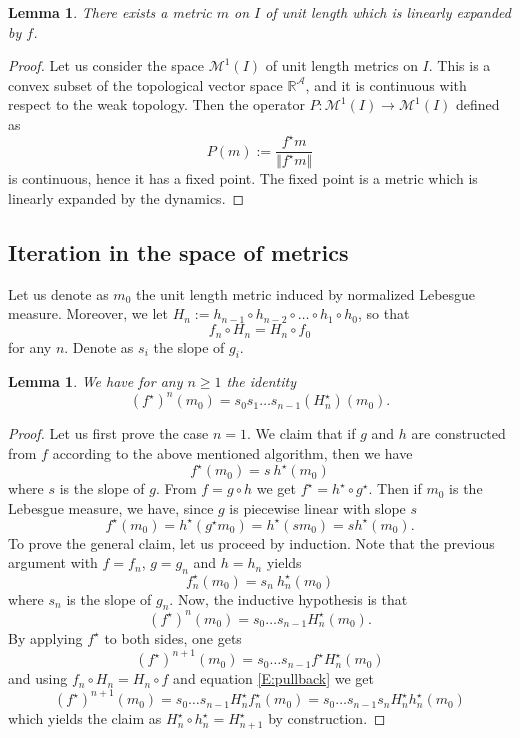 \documentclass[11pt]{amsart}
\newtheorem{lemma}[theorem]{Lemma}
\begin{document}
\begin{lemma}
There exists a metric $m$ on $I$ of unit length which is linearly expanded by $f$. 
\end{lemma}

\begin{proof}
Let us consider the space $\mathcal{M}^1(I)$ of unit length metrics on $I$. This is a convex subset of the topological vector space $\mathbb{R}^{\mathcal{A}}$, and it is continuous with respect to the weak topology. 
Then the operator 
$P :  \mathcal{M}^1(I) \to \mathcal{M}^1(I)$ defined as 
$$P(m) := \frac{f^\star m}{\Vert f^\star m \Vert}$$
is continuous, hence it has a fixed point. The fixed point is a metric which is linearly expanded by the dynamics.
\end{proof}

\subsection{Iteration in the space of metrics}

Let us denote as $m_0$ the unit length metric induced by normalized Lebesgue measure.
Moreover, we let $H_n := h_{n-1} \circ h_{n-2} \circ \dots \circ h_1 \circ h_0$, so that 
\begin{equation} \label{E:defHn}
f_n \circ H_n = H_n \circ f_0
\end{equation}
for any $n$. Denote as $s_i$ the slope of $g_i$. 

\begin{lemma}
We have for any $n \geq 1$ the identity
$$(f^\star)^{n}(m_0) = s_0 s_1 \dots s_{n-1} (H_n^\star)(m_0).$$ 
\end{lemma}

\begin{proof}
Let us first prove the case $n = 1$. We claim that if $g$ and $h$ are constructed from $f$ according to the 
above mentioned algorithm, then we have 
$$f^\star(m_0) = s \ h^\star(m_0)$$ 
where $s$ is the slope of $g$. 
From $f = g \circ h$ we get $f^\star = h^\star \circ g^\star$.
Then if $m_0$ is the Lebesgue measure, we have, since $g$ is piecewise linear with slope $s$
$$f^\star(m_0) = h^\star (g^\star m_0) = h^\star (s m _0) = s h^\star (m_0).$$
To prove the general claim, let us proceed by induction. Note that the previous argument with $f= f_n$, $g = g_n$ and 
$h = h_n$ yields
\begin{equation} \label{E:pullback}
f_n^\star(m_0) = s_n \ h_n^\star(m_0)
\end{equation}
where $s_n$ is the slope of $g_n$. Now, the inductive hypothesis is that 
$$(f^\star)^n(m_0) = s_0 \dots s_{n-1} H_{n}^\star(m_0).$$
By applying $f^\star$ to both sides, one gets
$$(f^\star)^{n+1}(m_0) = s_0 \dots s_{n-1} f^\star H_{n}^\star(m_0) $$
and using $f_n \circ H_{n} = H_{n} \circ f$ and equation \eqref{E:pullback} we get 
$$ (f^\star)^{n+1}(m_0) = s_0 \dots s_{n-1} H_{n}^\star f_n^\star(m_0) = s_0 \dots s_{n-1} s_n H_{n}^\star h_n^\star(m_0)$$
which yields the claim as $H_{n}^\star \circ h_n^\star = H_{n+1}^\star$ by construction.
\end{proof}
\end{document}
